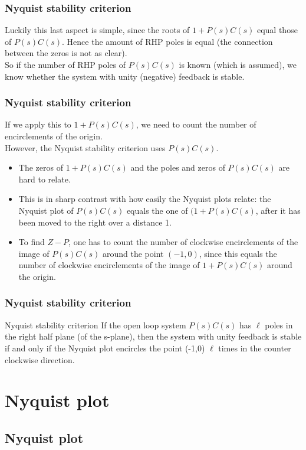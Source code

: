 \begin{frame}
	\frametitle{Nyquist stability criterion}
	\vspace{-10ex}
	Luckily this last aspect is simple, since the roots of $1+P(s)C(s)$ equal those of $P(s)C(s)$. Hence the amount of RHP poles is equal (the connection between the zeros is not as clear).\\
	\bigskip
	So if the number of RHP poles of $P(s)C(s)$ is known (which is assumed), we know whether the system with unity (negative) feedback is stable.
\end{frame}

\begin{frame}
	\frametitle{Nyquist stability criterion}
	If we apply this to $1+P(s)C(s)$, we need to count the number of encirclements of the origin.\\
	However, the Nyquist stability criterion uses $P(s)C(s)$.
	\begin{itemize}
		\item The zeros of $1+P(s)C(s)$ and the poles and zeros of $P(s)C(s)$ are hard to relate.
		\item This is in sharp contrast with how easily the Nyquist plots relate: the Nyquist plot of $P(s)C(s)$ equals the one of $(1+P(s)C(s)$, after it has been moved to the right over a distance 1.
		\item To find $Z-P$, one has to count the number of clockwise encirclements of the image of $P(s)C(s)$ around the point $(-1,0)$, since this equals the number of clockwise encirclements of the image of $1+P(s)C(s)$ around the origin.
	\end{itemize}
\end{frame}

\begin{frame}
	\frametitle{Nyquist stability criterion}
	\begin{block}{Nyquist stability criterion}
		If the open loop system $P(s)C(s)$ has $\ell$ poles in the right half plane (of the s-plane), then the system with unity feedback is stable if and only if the Nyquist plot encircles the point (-1,0) $\ell$ times in the counter clockwise direction.
	\end{block}
\end{frame}

\section{Nyquist plot}

\subsection{Nyquist plot}

